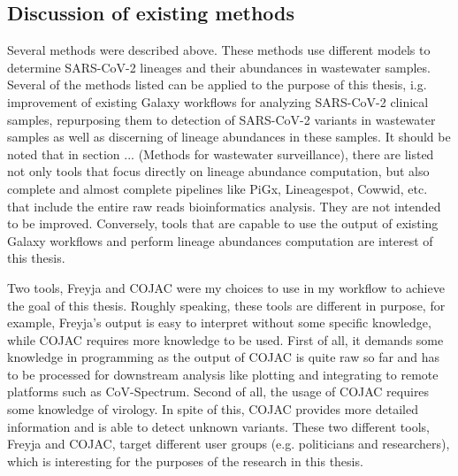     \subsection{Discussion of existing methods} \label{sec:prior:discussion}
    Several methods were described above. These methods use different models to determine SARS-CoV-2 lineages and their abundances in wastewater samples. Several of the methods listed can be applied to the purpose of this thesis, i.g. improvement of existing Galaxy workflows for analyzing SARS-CoV-2 clinical samples, repurposing them to detection of SARS-CoV-2 variants in wastewater samples as well as discerning of lineage abundances in these samples. It should be noted that in section ... (Methods for wastewater surveillance), there are listed not only tools that focus directly on lineage abundance computation, but also complete and almost complete pipelines like PiGx, Lineagespot, Cowwid, etc. that include the entire raw reads bioinformatics analysis. They are not intended to be improved. Conversely, tools that are capable to use the output of existing Galaxy workflows and perform lineage abundances computation are interest of this thesis.

    Two tools, Freyja \cite{joshuailevy2022,karthikeyan2022} and COJAC \cite{jahn2021} were my choices to use in my workflow to achieve the goal of this thesis. Roughly speaking, these tools are different in purpose, for example, Freyja’s output is easy to interpret without some specific knowledge, while COJAC requires more knowledge to be used. First of all, it demands some knowledge in programming as the output of COJAC is quite raw so far and has to be processed for downstream analysis like plotting and integrating to remote platforms such as CoV-Spectrum. Second of all, the usage of COJAC requires some knowledge of virology. In spite of this, COJAC provides more detailed information and is able to detect unknown variants. These two different tools, Freyja and COJAC, target different user groups (e.g. politicians and researchers), which is interesting for the purposes of the research in this thesis.
       
